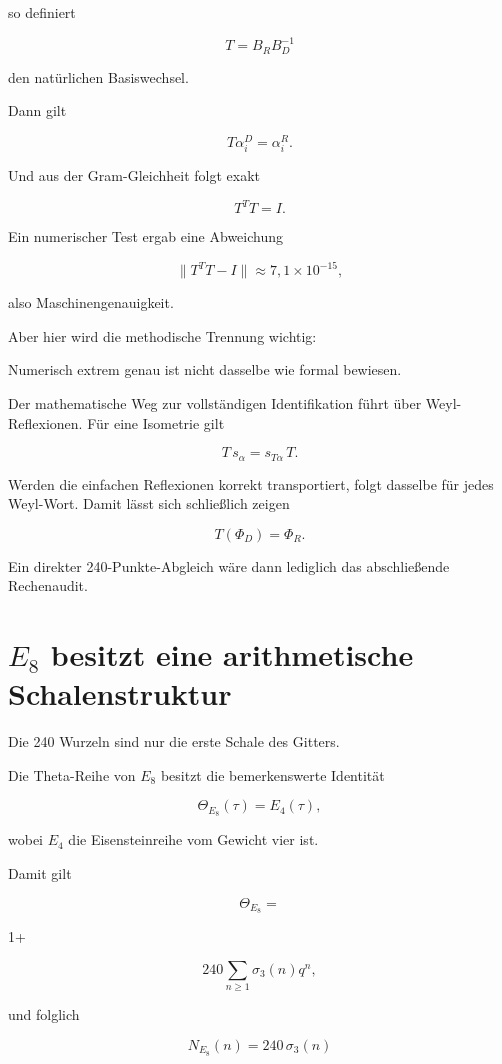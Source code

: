 \documentclass[11pt,a4paper]{article}
\begin{document}
so definiert


\[
T=B_RB_D^{-1}
\]


den natürlichen Basiswechsel.


Dann gilt


\[
T\alpha_i^D=\alpha_i^R.
\]


Und aus der Gram-Gleichheit folgt exakt


\[
T^TT=I.
\]


Ein numerischer Test ergab eine Abweichung


\[
\|T^TT-I\|\approx7{,}1\times10^{-15},
\]


also Maschinengenauigkeit.


Aber hier wird die methodische Trennung wichtig:


Numerisch extrem genau ist nicht dasselbe wie formal bewiesen.


Der mathematische Weg zur vollständigen Identifikation führt über Weyl-Reflexionen. Für eine Isometrie gilt


\[
T\,s_\alpha=s_{T\alpha}\,T.
\]


Werden die einfachen Reflexionen korrekt transportiert, folgt dasselbe für jedes Weyl-Wort. Damit lässt sich schließlich zeigen


\[
T(\Phi_D)=\Phi_R.
\]


Ein direkter 240-Punkte-Abgleich wäre dann lediglich das abschließende Rechenaudit.





\section{\texorpdfstring{\(E_8\) besitzt eine arithmetische Schalenstruktur}{E8 besitzt eine arithmetische Schalenstruktur}}


Die 240 Wurzeln sind nur die erste Schale des Gitters.


Die Theta-Reihe von \(E_8\) besitzt die bemerkenswerte Identität


\[
\Theta_{E_8}(\tau)=E_4(\tau),
\]


wobei \(E_4\) die Eisensteinreihe vom Gewicht vier ist.


Damit gilt


\[
\Theta_{E_8}
=
\]

1+

\[
240\sum_{n\ge1}\sigma_3(n)q^n,
\]


und folglich


\[
\boxed{
N_{E_8}(n)=240\,\sigma_3(n)
}
\]
\end{document}
